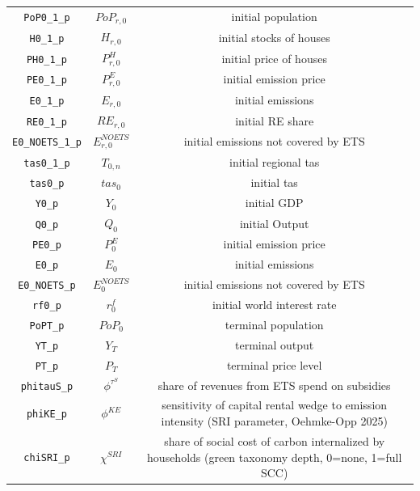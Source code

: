 \begin{center}
\begin{longtable}{ccc}
\texttt{PoP0\_1\_p} & ${PoP_{r,0}}$ & initial population\\
\texttt{H0\_1\_p} & ${H_{r,0}}$ & initial stocks of houses\\
\texttt{PH0\_1\_p} & ${P^H_{r,0}}$ & initial price of houses\\
\texttt{PE0\_1\_p} & ${P^E_{r,0}}$ & initial emission price\\
\texttt{E0\_1\_p} & ${E_{r,0}}$ & initial emissions\\
\texttt{RE0\_1\_p} & ${RE_{r,0}}$ & initial RE share\\
\texttt{E0\_NOETS\_1\_p} & ${E^{NOETS}_{r,0}}$ & initial emissions not covered by ETS\\
\texttt{tas0\_1\_p} & ${T_{0,n}}$ & initial regional tas\\
\texttt{tas0\_p} & ${tas_{0}}$ & initial tas\\
\texttt{Y0\_p} & ${Y_0}$ & initial GDP\\
\texttt{Q0\_p} & ${Q_0}$ & initial Output\\
\texttt{PE0\_p} & ${P^E_0}$ & initial emission price\\
\texttt{E0\_p} & ${E_0}$ & initial emissions\\
\texttt{E0\_NOETS\_p} & ${E^{NOETS}_0}$ & initial emissions not covered by ETS\\
\texttt{rf0\_p} & ${r^f_0}$ & initial world interest rate\\
\texttt{PoPT\_p} & ${PoP_0}$ & terminal population\\
\texttt{YT\_p} & ${Y_T}$ & terminal output\\
\texttt{PT\_p} & ${P_T}$ & terminal price level\\
\texttt{phitauS\_p} & ${\phi^{\tau^S}}$ & share of revenues from ETS spend on subsidies\\
\texttt{phiKE\_p} & ${\phi^{KE}}$ & sensitivity of capital rental wedge to emission intensity (SRI parameter, Oehmke-Opp 2025)\\
\texttt{chiSRI\_p} & ${\chi^{SRI}}$ & share of social cost of carbon internalized by households (green taxonomy depth, 0=none, 1=full SCC)\\
\hline%
\end{longtable}
\end{center}

